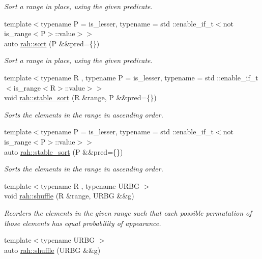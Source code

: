 \begin{DoxyCompactItemize}
\begin{DoxyCompactList}\small\item\em Sort a range in place, using the given predicate. \end{DoxyCompactList}\item 
{\footnotesize template$<$typename P  = is\+\_\+lesser, typename  = std \+::enable\+\_\+if\+\_\+t$<$not is\+\_\+range$<$\+P$>$\+::value$>$$>$ }\\auto \mbox{\hyperlink{namespacerah_a3a938d529ef4564281a5dca2ce49b538}{rah\+::sort}} (P \&\&pred=\{\})
\begin{DoxyCompactList}\small\item\em Sort a range in place, using the given predicate. \end{DoxyCompactList}\item 
{\footnotesize template$<$typename R , typename P  = is\+\_\+lesser, typename  = std \+::enable\+\_\+if\+\_\+t$<$is\+\_\+range$<$\+R$>$\+::value$>$$>$ }\\void \mbox{\hyperlink{namespacerah_a215c9f80364af9121e2be42d1ebacdbf}{rah\+::stable\+\_\+sort}} (R \&range, P \&\&pred=\{\})
\begin{DoxyCompactList}\small\item\em Sorts the elements in the range in ascending order. \end{DoxyCompactList}\item 
{\footnotesize template$<$typename P  = is\+\_\+lesser, typename  = std \+::enable\+\_\+if\+\_\+t$<$not is\+\_\+range$<$\+P$>$\+::value$>$$>$ }\\auto \mbox{\hyperlink{namespacerah_aa45a27d7e9403b82624632e1ee3daf6f}{rah\+::stable\+\_\+sort}} (P \&\&pred=\{\})
\begin{DoxyCompactList}\small\item\em Sorts the elements in the range in ascending order. \end{DoxyCompactList}\item 
{\footnotesize template$<$typename R , typename U\+R\+BG $>$ }\\void \mbox{\hyperlink{namespacerah_ab1d00692710a6ee8e5b3110a56bbd59c}{rah\+::shuffle}} (R \&range, U\+R\+BG \&\&g)
\begin{DoxyCompactList}\small\item\em Reorders the elements in the given range such that each possible permutation of those elements has equal probability of appearance. \end{DoxyCompactList}\item 
{\footnotesize template$<$typename U\+R\+BG $>$ }\\auto \mbox{\hyperlink{namespacerah_a93f2ab22986c011ca40816c52638e0ad}{rah\+::shuffle}} (U\+R\+BG \&\&g)

\end{DoxyCompactItemize}
